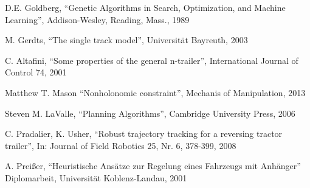\documentclass[bsc,en,
oneside,12pt,utf8,a4paper,
]{thesisdifctunl}
\begin{document}
\begin{thebibliography}{9}
	D.E. Goldberg,
	"`Genetic Algorithms in Search, Optimization, and Machine Learning"',
	Addison-Wesley, Reading, Mass.,
	1989
	
	M. Gerdts,
	"`The single track model"',
	Universität Bayreuth,
	2003
	
	C. Altafini,
	"`Some properties of the general n-trailer"',
	International Journal of Control 74,
	2001
	
	Matthew T. Mason
	"`Nonholonomic constraint"',
	Mechanis of Manipulation,
	2013
	
	Steven M. LaValle,
	"`Planning Algorithms"',
	Cambridge University Press,
	2006
	
	C. Pradalier, K. Usher,
	"`Robust trajectory tracking for a reversing tractor trailer"',
	In: Journal of Field Robotics 25, Nr. 6, 378-399,
	2008
	
	A. Preißer,
	"`Heuristische Ansätze zur Regelung eines Fahrzeugs mit Anhänger"'
	Diplomarbeit, Universität Koblenz-Landau,
	2001

\end{thebibliography}


\end{document}
